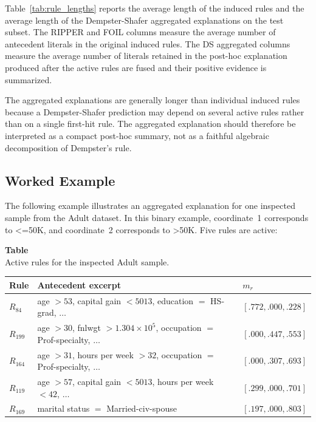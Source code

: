 \documentclass[conference]{IEEEtran}
\newcommand{\code}[1]{\textnormal{#1}}
\begin{document}
Table~\ref{tab:rule_lengths} reports the average length of the induced rules and the average length of the Dempster-Shafer aggregated explanations on the test subset. The RIPPER and FOIL columns measure the average number of antecedent literals in the original induced rules. The DS aggregated columns measure the average number of literals retained in the post-hoc explanation produced after the active rules are fused and their positive evidence is summarized.

The aggregated explanations are generally longer than individual induced rules because a Dempster-Shafer prediction may depend on several active rules rather than on a single first-hit rule. The aggregated explanation should therefore be interpreted as a compact post-hoc summary, not as a faithful algebraic decomposition of Dempster's rule.

\subsection{Worked Example}

The following example illustrates an aggregated explanation for one inspected sample from the Adult dataset. In this binary example, coordinate~1 corresponds to \code{<=50K}, and coordinate~2 corresponds to \code{>50K}. Five rules are active:

\begin{center}
  \begin{minipage}{\columnwidth}
  \label{tab:worked_active_rules}
  \centering
  \scriptsize
  \textbf{Table~\thetable}\\
  Active rules for the inspected Adult sample.
  \vspace{2pt}

  \setlength{\tabcolsep}{2.2pt}
  \begin{tabular}{@{}l p{} l@{}}
    \toprule
    Rule & Antecedent excerpt & $m_r$ \\
    \midrule
    $R_{84}$ & age $>53$, capital gain $<5013$, education $=$ HS-grad, $\ldots$ & $[.772,.000,.228]$ \\
    $R_{199}$ & age $>30$, fnlwgt $>1.304{\times}10^{5}$, occupation $=$ Prof-specialty, $\ldots$ & $[.000,.447,.553]$ \\
    $R_{164}$ & age $>31$, hours per week $>32$, occupation $=$ Prof-specialty, $\ldots$ & $[.000,.307,.693]$ \\
    $R_{119}$ & age $>57$, capital gain $<5013$, hours per week $<42$, $\ldots$ & $[.299,.000,.701]$ \\
    $R_{169}$ & marital status $=$ Married-civ-spouse & $[.197,.000,.803]$ \\
    \bottomrule
  \end{tabular}
  \end{minipage}
\end{center}
\end{document}
